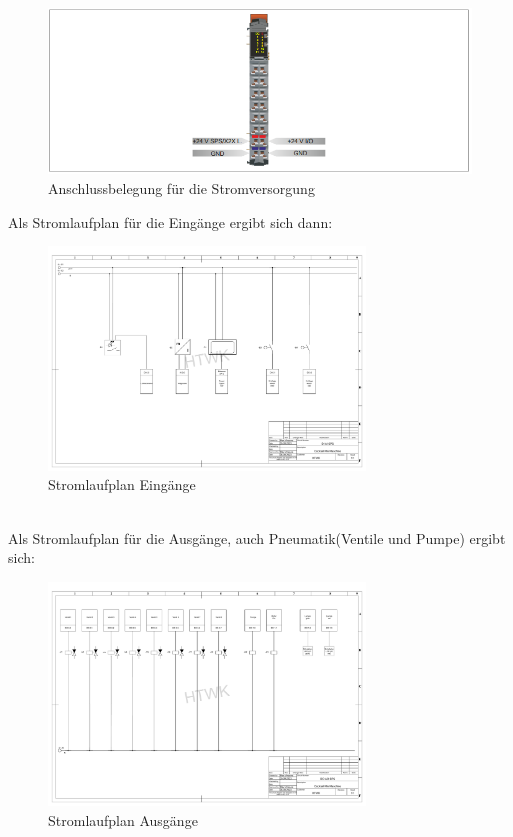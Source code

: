 \documentclass[10pt,a4paper]{report}
\begin{document}
	\begin{figure}[htb]
		\includegraphics[width=1\textwidth]{H4}
		\centering
		\caption{Anschlussbelegung für die Stromversorgung}
	\end{figure}
	\newpage
	Als Stromlaufplan für die Eingänge ergibt sich dann: \\
	\begin{figure}[htb]
		\includegraphics[width=0.75\textwidth]{DI AI (V2).pdf}
		\centering
		\caption{Stromlaufplan Eingänge}
	\end{figure}
	\\Als Stromlaufplan für die Ausgänge, auch Pneumatik(Ventile und Pumpe) ergibt sich: \\
	\begin{figure}[htb]
		\includegraphics[width=0.75\textwidth]{DO AO SPS (V2).pdf}
		\centering
		\caption{Stromlaufplan Ausgänge}
	\end{figure}
\end{document}
